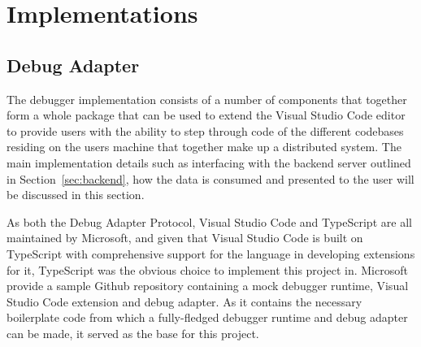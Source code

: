 \documentclass[12pt,pdftex,titlepage]{report}
\begin{document}
        \newpage          
        \section{Implementations}    
            \subsection{Debug Adapter}
            \label{sec:impldebug}
                The debugger implementation consists of a number of components that together form a whole package that can be used to extend the Visual Studio Code editor to provide users with the ability
                to step through code of the different codebases residing on the users machine that together make up a distributed system. The main implementation details such as interfacing with the backend
                server outlined in Section~\ref{sec:backend}, how the data is consumed and presented to the user will be discussed in this section.

                As both the Debug Adapter Protocol, Visual Studio Code and TypeScript are all maintained by Microsoft, and given that Visual Studio Code is built on TypeScript with comprehensive support for the language
                in developing extensions for it, TypeScript was the obvious choice to implement this project in. Microsoft provide a sample Github repository containing a mock debugger runtime, Visual Studio Code extension
                and debug adapter. As it contains the necessary boilerplate code from which a fully-fledged debugger runtime and debug adapter can be made, it served as the base for this project.
\end{document}
